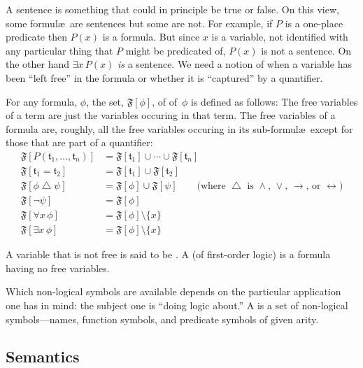 \documentclass{article}
\newcommand{\var}[1]{\mathit{#1}} %
\newcommand{\term}[1]{\mathfrak{#1}} %
\newcommand{\fv}{\mathfrak{F}}
\begin{document}
A sentence is something that could in principle be true or false. On
this view, some formul\ae\ are sentences but some are not. For example,
if $P$ is a one-place predicate then $P(\var{x})$ is a formula. But
since $\var{x}$ is a variable, not identified with any particular thing
that $P$ might be predicated of, $P(\var{x})$ is not a sentence. On the
other hand $\exists\var{x}\,P(\var{x})$ \emph{is} a sentence. We need a notion of when a variable has been ``left free'' in the formula or whether it is ``captured'' by a quantifier. 

For any formula, $\phi$, the set, $\fv[\phi]$, of  of~$\phi$ is defined as follows: The free variables of a term are just the variables occuring in that term. The free variables of a formula are, roughly, all the free variables occuring in its sub-formul\ae\ except for those that are part of a quantifier:
\begin{align*}
  \fv[P(\term{t}_1,\dotsc,\term{t}_n)]
  &= \fv[\term{t}_1] \cup\dotsb\cup\fv[\term{t}_n] \\
  \fv[\term{t}_1 = \term{t}_2] 
  &= \fv[\term{t}_1] \cup \fv[\term{t}_2] \\
  \fv[\phi \bigtriangleup \psi] 
  &= \fv[\phi] \cup \fv[\psi]\qquad\text{(where $\bigtriangleup$ is $\wedge$, $\vee$, $\rightarrow$, or $\leftrightarrow$)}  \\
  \fv[\neg\psi]
  &= \fv[\phi] \\
  \fv[\forall \var{x}\,\phi]
  &= \fv[\phi] \setminus \{\var{x}\}\\
  \fv[\exists \var{x}\,\phi]
  &= \fv[\phi] \setminus \{\var{x}\}
\end{align*}

A variable that is not free is said to be . A  (of first-order logic) is a formula having no free variables.

Which non-logical symbols are available depends on the particular
application one has in mind: the subject one is ``doing logic about.'' A
 is a set of non-logical symbols---names, function
symbols, and predicate symbols of given arity.

\subsection{Semantics}
\end{document}
